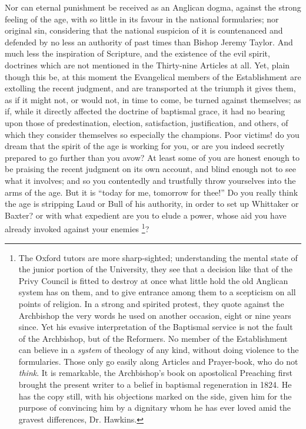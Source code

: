 Nor can eternal punishment be received as an Anglican dogma,
against the strong feeling of the age, with so little in its favour in
the national formularies; nor original sin, considering that the
national suspicion of it is countenanced and defended by no less an
authority of past times than Bishop Jeremy Taylor. And much less the
inspiration of Scripture, and the existence of the evil spirit,
doctrines which are not mentioned in the Thirty-nine Articles at all.
Yet, plain though this be, at this moment the Evangelical members of
the Establishment are extolling the recent judgment, and are
transported at the triumph it gives them, as if it might not, or would
not, in time to come, be turned against themselves; as if, while it
directly affected the doctrine of baptismal grace, it had no bearing
upon those of predestination, election, satisfaction, justification,
and others, of which they consider themselves so especially the
champions. Poor victims! do you dream that the spirit of the age is
working for you, or are you indeed secretly prepared to go further
than you avow? At least some of you are honest enough to be praising
the recent judgment on its own account, and blind enough not to see
what it involves; and so you contentedly and trustfully throw
yourselves into the arms of the age. But it is ``today for me,
tomorrow for thee!'' Do you really think the age is stripping Laud
or Bull of his authority, in order to set up Whittaker or Baxter? or
with what expedient are you to elude a power, whose aid you have
already invoked against your enemies \footnote{The Oxford tutors are more sharp-sighted;
understanding the mental state of the junior portion of the
University, they see that a decision like that of the Privy Council is
fitted to destroy at once what little hold the old Anglican system has
on them, and to give entrance among them to a scepticism on all points
of religion. In a strong and spirited protest, they quote against the
Archbishop the very words he used on another occasion, eight or nine
years since. Yet his evasive interpretation of the Baptismal service
is not the fault of the Archbishop, but of the Reformers. No member of
the Establishment can believe in a \emph{system} of theology of any
kind, without doing violence to the formularies. Those only go easily
along Articles and Prayer-book, who do not \emph{think}. It is
remarkable, the Archbishop's book on apostolical Preaching first
brought the present writer to a belief in baptismal regeneration in
1824. He has the copy still, with his objections marked on the side,
given him for the purpose of convincing him by a dignitary whom he has
ever loved amid the gravest differences, Dr. Hawkins.}?

